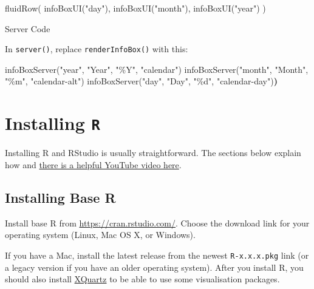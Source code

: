 \documentclass[
]{book}
\newenvironment{Shaded}{\begin{snugshade}}{\end{snugshade}}
\newcommand{\ErrorTok}[1]{\textcolor[rgb]{0.64,0.00,0.00}{\textbf{#1}}}
\newcommand{\FunctionTok}[1]{\textcolor[rgb]{0.00,0.00,0.00}{#1}}
\newcommand{\NormalTok}[1]{#1}
\newcommand{\StringTok}[1]{\textcolor[rgb]{0.31,0.60,0.02}{#1}}
\begin{document}
\begin{Shaded}
\begin{Highlighting}[]
\FunctionTok{fluidRow}\NormalTok{(}
    \FunctionTok{infoBoxUI}\NormalTok{(}\StringTok{"day"}\NormalTok{),}
    \FunctionTok{infoBoxUI}\NormalTok{(}\StringTok{"month"}\NormalTok{),}
    \FunctionTok{infoBoxUI}\NormalTok{(}\StringTok{"year"}\NormalTok{)}
\NormalTok{)}
\end{Highlighting}
\end{Shaded}

Server Code

In \texttt{server()}, replace \texttt{renderInfoBox()} with this:

\begin{Shaded}
\begin{Highlighting}[]
\FunctionTok{infoBoxServer}\NormalTok{(}\StringTok{"year"}\NormalTok{, }\StringTok{"Year"}\NormalTok{, }\StringTok{"\%Y"}\NormalTok{, }\StringTok{"calendar"}\NormalTok{)}
\FunctionTok{infoBoxServer}\NormalTok{(}\StringTok{"month"}\NormalTok{, }\StringTok{"Month"}\NormalTok{, }\StringTok{"\%m"}\NormalTok{, }\StringTok{"calendar{-}alt"}\NormalTok{)}
\FunctionTok{infoBoxServer}\NormalTok{(}\StringTok{"day"}\NormalTok{, }\StringTok{"Day"}\NormalTok{, }\StringTok{"\%d"}\NormalTok{, }\StringTok{"calendar{-}day"}\NormalTok{)}\ErrorTok{)}
\end{Highlighting}
\end{Shaded}

\hypertarget{appendix-appendices}{%
\appendix}


\hypertarget{installing-r}{%
\chapter{\texorpdfstring{Installing \texttt{R}}{Installing R}}\label{installing-r}}

Installing R and RStudio is usually straightforward. The sections below explain how and \href{https://www.youtube.com/watch?v=lVKMsaWju8w}{there is a helpful YouTube video here}.

\hypertarget{installing-base-r}{%
\section{Installing Base R}\label{installing-base-r}}

Install base R from \url{https://cran.rstudio.com/}. Choose the download link for your operating system (Linux, Mac OS X, or Windows).

If you have a Mac, install the latest release from the newest \texttt{R-x.x.x.pkg} link (or a legacy version if you have an older operating system). After you install R, you should also install \href{http://xquartz.macosforge.org/}{XQuartz} to be able to use some visualisation packages.
\end{document}
